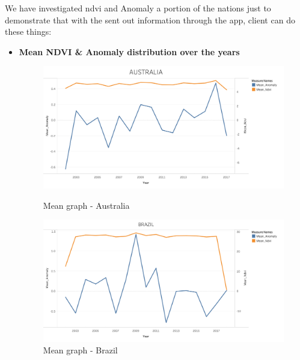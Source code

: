 We have investigated \gls{ndvi} and Anomaly a portion of the nations just to demonstrate that with the sent out information through the app, client can do these things:

\newpage

\begin{itemize}
    \item \textbf{Mean NDVI \& Anomaly distribution over the years}
    
    \begin{figure}[!htb]
        \begin{minipage}{0.5\textwidth}
            \centering
            \includegraphics[width=1.0\linewidth]{figures/ch5/Mean/AUSTRALIA_mean.png}
            \caption{Mean graph - Australia}\label{Fig:AUSTRALIA_mean}
        \end{minipage}\hfill
        \begin{minipage}{0.5\textwidth}
            \centering
            \includegraphics[width=1.0\linewidth]{figures/ch5/Mean/BRAZIL_mean.png}
            \caption{Mean graph - Brazil}\label{Fig:BRAZIL_mean}
        \end{minipage}
    \end{figure}
    

\end{itemize}
